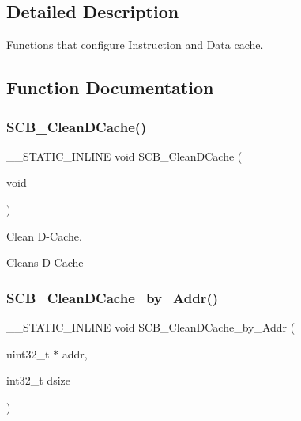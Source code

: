 \subsection{Detailed Description}
Functions that configure Instruction and Data cache. 



\subsection{Function Documentation}
\mbox{\label{group___c_m_s_i_s___core___cache_functions_ga55583e3065c6eabca204b8b89b121c4c}} 
\subsubsection{\texorpdfstring{SCB\_CleanDCache()}{SCB\_CleanDCache()}}
{\footnotesize\ttfamily \+\_\+\+\_\+\+S\+T\+A\+T\+I\+C\+\_\+\+I\+N\+L\+I\+NE void S\+C\+B\+\_\+\+Clean\+D\+Cache (\begin{DoxyParamCaption}\item[{void}]{ }\end{DoxyParamCaption})}



Clean D-\/\+Cache. 

Cleans D-\/\+Cache \mbox{\label{group___c_m_s_i_s___core___cache_functions_ga696fadbf7b9cc71dad42fab61873a40d}} 
\subsubsection{\texorpdfstring{SCB\_CleanDCache\_by\_Addr()}{SCB\_CleanDCache\_by\_Addr()}}
{\footnotesize\ttfamily \+\_\+\+\_\+\+S\+T\+A\+T\+I\+C\+\_\+\+I\+N\+L\+I\+NE void S\+C\+B\+\_\+\+Clean\+D\+Cache\+\_\+by\+\_\+\+Addr (\begin{DoxyParamCaption}\item[{uint32\+\_\+t $\ast$}]{addr,  }\item[{int32\+\_\+t}]{dsize }\end{DoxyParamCaption})}



